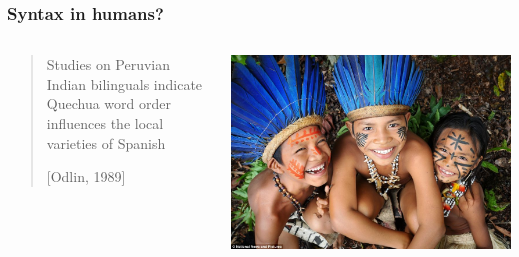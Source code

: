 \documentclass[mathserif,12pt]{beamer}
\begin{document}
\begin{frame}
\frametitle{Syntax in humans?}
\begin{center}
\begin{columns}
\begin{column}{0.7\textwidth}
  \begin{quote}
   Studies on Peruvian Indian bilinguals indicate Quechua word order influences the local varieties of Spanish
   
   [Odlin, 1989]
  \end{quote}
\end{column}
\begin{column}{0.3\textwidth}
  \begin{center}
   \includegraphics[width=\textwidth]{figures/amazon-tribes}
  \end{center}
\end{column}
\end{columns}
\vspace{0.5cm}
\begin{columns}

\begin{column}{0.3\textwidth}
   
\end{column}
\end{columns}
\end{center}
\end{frame}
\end{document}

